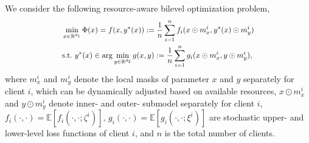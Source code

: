 \documentclass[lettersize,journal]{IEEEtran}
\begin{document}
We consider the following resource-aware bilevel optimization problem,
\begin{equation}
\scalebox{0.9}{$
\begin{aligned}\label{objective2}
&\min_{x\in\mathbb{R}^{d_1}} \Phi(x)=f(x, y^*(x)): = 
\frac{1}{n} \sum_{i=1}^n f_i(x\odot m_x^i, y^*(x)\odot m_y^i) 
\\& \mbox{s.t.} ~y^*(x)\in \arg \min_{y\in\mathbb{R}^{d_2}} g(x,y):=
\frac{1}{n}\sum_{i=1}^n g_i(x\odot m_x^i,y\odot m_y^i),
\end{aligned}
$}    
\end{equation}
where $m_x^i$ and $m_y^i$ denote the local masks of parameter $x$ and $y$ separately for client $i$, which can be dynamically adjusted based on available resources, $x\odot m_x^i$ and $y\odot m_y^i$ denote inner- and outer- submodel separately for client $i$, $f_i(\cdot, \cdot) = \mathbb{E}[f_i(\cdot, \cdot;\zeta^i)],\, g_i(\cdot, \cdot) = \mathbb{E}[g_i(\cdot, \cdot;\xi^i)]$ are stochastic upper- and lower-level loss functions of client $i$, and $n$ is the total number of clients. 
\end{document}

